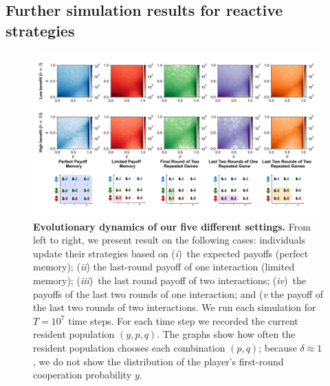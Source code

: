 \documentclass[11pt]{article}
\theoremstyle{plainCl1}
\theoremstyle{plainCl2}
\begin{document}

\subsection{Further simulation results for reactive strategies}\label{section:simulation_results}

\begin{figure}[t!]
    \centering 
    \includegraphics[width=\textwidth]{static/more_memory_heatmaps_donation_game_with_illustrations.pdf}
    \caption{\textbf{Evolutionary dynamics of our five different settings.}
    From left to right, we present result on the following cases: individuals update their strategies based on
    ({\it i})~the expected payoffs (perfect memory); ({\it ii}) the last-round payoff
    of one interaction (limited memory); ({\it iii})~the last round payoff of two
    interactions; ({\it iv})~the payoffs of the last two rounds of one interaction; 
    and ({\it v} the payoff of the last two rounds of two interactions. We run each simulation for \(T
    = 10^7\) time steps. For each time step we recorded the current resident
    population \((y, p, q)\). The graphs show how often the
    resident population chooses each combination \((p, q)\); because $\delta\!\approx\!1$, we do not show the distribution of the player's first-round cooperation probability $y$.}\label{fig:expected_payoffs_results}
    \end{figure}
\end{document}
